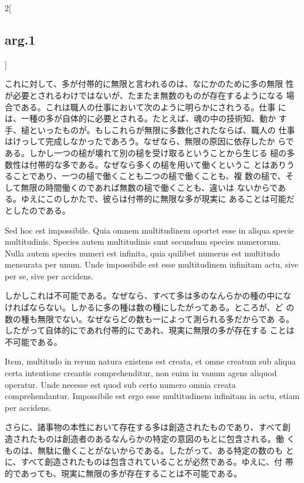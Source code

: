 \documentclass[paper=a4paper,fontsize=10pt,jafontsize=9pt,titlepage]{jlreq}
\begin{document}
\begin{paracol}{2}[\subsection{arg.1}]
\switchcolumn

これに対して、多が付帯的に無限と言われるのは、なにかのために多の無限
 性が必要とされるわけではないが、たまたま無数のものが存在するようになる
 場合である。これは職人の仕事において次のように明らかにされうる。仕事
 には、一種の多が自体的に必要とされる。たとえば、魂の中の技術知、動か
 す手、槌といったものが。もしこれらが無限に多数化されたならば、職人の
 仕事はけっして完成しなかったであろう。なぜなら、無限の原因に依存したか
 らである。しかし一つの槌が壊れて別の槌を受け取るということから生じる
 槌の多数性は付帯的な多である。なぜなら多くの槌を用いて働くというこ
 とはありうることであり、一つの槌で働くことも二つの槌で働くことも、複
 数の槌で、そして無限の時間働くのであれば無数の槌で働くことも、違いは
 ないからである。ゆえにこのしかたで、彼らは付帯的に無限な多が現実に
 あることは可能だとしたのである。

\switchcolumn*

Sed hoc est impossibile. Quia omnem multitudinem oportet esse in aliqua
 specie multitudinis. Species autem multitudinis sunt secundum species
 numerorum. Nulla autem species numeri est infinita, quia quilibet
 numerus est multitudo mensurata per unum. Unde impossibile est esse
 multitudinem infinitam actu, sive per se, sive per accidens.

\switchcolumn

しかしこれは不可能である。なぜなら、すべて多は多のなんらかの種の中にな
 ければならない。しかるに多の種は数の種にしたがってある。ところが、ど
 の数の種も無限でない。なぜならどの数も一によって測られる多だからであ
 る。したがって自体的にであれ付帯的にであれ、現実に無限の多が存在する
 ことは不可能である。

\switchcolumn*

Item, multitudo in rerum natura existens est creata, et omne creatum sub
 aliqua certa intentione creantis comprehenditur, non enim in vanum
 agens aliquod operatur. Unde necesse est quod sub certo numero omnia
 creata comprehendantur. Impossibile est ergo esse multitudinem
 infinitam in actu, etiam per accidens.

\switchcolumn

さらに、諸事物の本性において存在する多は創造されたものであり、すべて創
 造されたものは創造者のあるなんらかの特定の意図のもとに包含される。働
 くものは、無駄に働くことがないからである。したがって、ある特定の数のも
 とに、すべて創造されたものは包含されていることが必然である。ゆえに、付
 帯的であっても、現実に無限の多が存在することは不可能である。

\switchcolumn*


\end{paracol}
\end{document}
